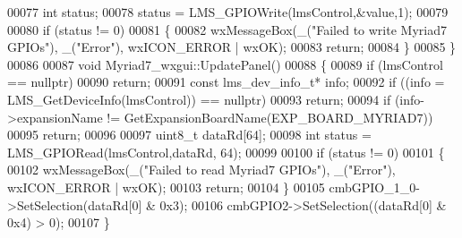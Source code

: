 \begin{DoxyCode}
00077     \textcolor{keywordtype}{int} status;
00078     status = LMS_GPIOWrite(lmsControl,&value,1);
00079 
00080     \textcolor{keywordflow}{if} (status != 0)
00081     \{
00082         wxMessageBox(\_(\textcolor{stringliteral}{"Failed to write Myriad7 GPIOs"}), \_(\textcolor{stringliteral}{"Error"}), wxICON\_ERROR | wxOK);
00083         \textcolor{keywordflow}{return};
00084     \}
00085 \}
00086 
00087 \textcolor{keywordtype}{void} Myriad7_wxgui::UpdatePanel()
00088 \{
00089     \textcolor{keywordflow}{if} (lmsControl == \textcolor{keyword}{nullptr})
00090         \textcolor{keywordflow}{return};
00091     \textcolor{keyword}{const} lms_dev_info_t* info;
00092     \textcolor{keywordflow}{if} ((info = LMS_GetDeviceInfo(lmsControl)) == \textcolor{keyword}{nullptr})
00093         \textcolor{keywordflow}{return};
00094     \textcolor{keywordflow}{if} (info->expansionName != GetExpansionBoardName(EXP_BOARD_MYRIAD7))
00095             \textcolor{keywordflow}{return};
00096 
00097     uint8\_t dataRd[64];
00098     \textcolor{keywordtype}{int} status = LMS_GPIORead(lmsControl,dataRd, 64);
00099 
00100     \textcolor{keywordflow}{if} (status != 0)
00101     \{
00102         wxMessageBox(\_(\textcolor{stringliteral}{"Failed to read Myriad7 GPIOs"}), \_(\textcolor{stringliteral}{"Error"}), wxICON\_ERROR | wxOK);
00103         \textcolor{keywordflow}{return};
00104     \}
00105     cmbGPIO\_1\_0->SetSelection(dataRd[0] & 0x3);
00106     cmbGPIO2->SetSelection((dataRd[0] & 0x4) > 0);
00107 \}
\end{DoxyCode}
